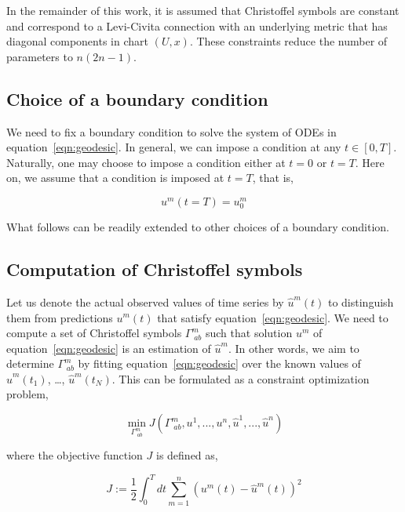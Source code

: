\documentclass[a4paper,11pt]{elsarticle}
\begin{document}
In the remainder of this work, it is assumed that Christoffel symbols
are constant and correspond to a Levi-Civita connection with an
underlying metric that has diagonal components in chart $(U,
x)$. These constraints reduce the number of parameters to $n(2n-1)$.

\subsection{Choice of a boundary condition}
\label{subsection:boundary-conditions}

We need to fix a boundary condition to solve the system of ODEs in
equation~\ref{eqn:geodesic}. In general, we can impose a condition at
any $t \in [0,T]$. Naturally, one may choose to impose a condition either
at $t = 0$ or $t = T$. Here on, we assume that a condition is imposed
at $t = T$, that is,

\begin{equation}\label{eqn:geodesic-bc}
u^{m}(t = T) = u^{m}_{0}
\end{equation}

What follows can be readily extended to other choices of a boundary
condition. 

\subsection{Computation of Christoffel symbols}
\label{subsection:optimization-problem}

Let us denote the actual observed values of time series by
$\hat{u}^{m}(t)$ to distinguish them from predictions $u^{m}(t)$ that
satisfy equation~\ref{eqn:geodesic}. We need to compute a set of
Christoffel symbols $\Gamma^{m}_{\;ab}$ such that solution $u^{m}$ of
equation~\ref{eqn:geodesic} is an estimation of $\hat{u}^{m}$. In
other words, we aim to determine $\Gamma^{m}_{\;ab}$ by fitting
equation~\ref{eqn:geodesic} over the known values of
$\hat{u}^{m}(t_{1})$, \dots, $\hat{u}^{m}(t_{N})$. This can be
formulated as a constraint optimization problem,

\begin{equation}\label{eqn:optimization-problem}
\min_{\Gamma^{m}_{\;ab}}
J(\Gamma^{m}_{\;ab},u^{1},...,u^{n},\hat{u}^{1},...,\hat{u}^{n})
\end{equation}

where the objective function $J$ is defined as,

\begin{equation}\label{eqn:optimization-objective-raw}
J := \frac{1}{2} \int_{0}^{T} dt \sum_{m=1}^{n} (u^{m}(t) -
\hat{u}^{m}(t))^2
\end{equation}
\end{document}
